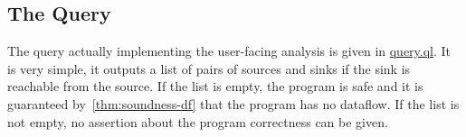 \subsection{The Query}
The query actually implementing the user-facing analysis is given in \hyperref[lst:query]{query.ql}.
It is very simple, it outputs a list of pairs of sources and sinks if the
sink is reachable from the source.
If the list is empty, the program is safe and it is guaranteed by~\autoref{thm:soundness-df}
that the program has no dataflow.
If the list is not empty, no assertion about the program correctness can be given.
